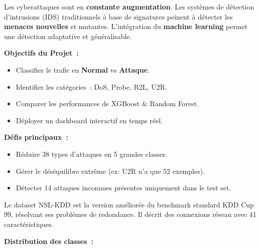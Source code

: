 \documentclass{article}
\newlength{\colW}  \setlength{\colW}{180mm}
\newcommand{\bodyfont}{\fontsize{16}{22}\selectfont}
\newcommand{\labelfont}{\fontsize{14}{18}\selectfont\bfseries}
\newcommand{\citem}[1]{\item[\textcolor{Secondary}{\faCaretRight}] #1}
\begin{document}
\noindent
\begin{minipage}[t]{\colW}

\begin{tcolorbox}[pc, title={\faShieldAlt\; Contexte \& Objectifs}]
\bodyfont\color{TextMain}
Les cyberattaques sont en \textbf{\color{Primary}constante augmentation}. Les syst\`emes de d\'etection d'intrusions (IDS) traditionnels \`a base de signatures peinent \`a d\'etecter les \textbf{\color{Secondary}menaces nouvelles} et mutantes. L'int\'egration du \textbf{machine learning} permet une d\'etection adaptative et g\'en\'eralisable.

\vspace{5mm}
{\labelfont\color{Primary}Objectifs du Projet~:}
\begin{itemize}[leftmargin=6mm, itemsep=2mm, topsep=2mm]
  \citem{Classifier le trafic en \textbf{Normal} vs \textbf{Attaque}.}
  \citem{Identifier les cat\'egories~: DoS, Probe, R2L, U2R.}
  \citem{Comparer les performances de XGBoost \& Random Forest.}
  \citem{D\'eployer un dashboard interactif en temps r\'eel.}
\end{itemize}

\vspace{5mm}
{\labelfont\color{Primary}D\'efis principaux~:}
\begin{itemize}[leftmargin=6mm, itemsep=2mm, topsep=2mm]
  \citem{R\'eduire 38 types d'attaques en 5 grandes classes.}
  \citem{G\'erer le d\'es\'equilibre extr\^eme (ex: U2R n'a que 52 exemples).}
  \citem{D\'etecter 14 attaques inconnues pr\'esentes uniquement dans le test set.}
\end{itemize}
\end{tcolorbox}

\vspace{8mm}

\begin{tcolorbox}[pc, title={\faDatabase\; Dataset NSL-KDD}]
\bodyfont\color{TextMain}
Le dataset NSL-KDD est la version am\'elior\'ee du benchmark standard KDD Cup 99, r\'esolvant ses probl\`emes de redondance. Il d\'ecrit des connexions r\'eseau avec 41 caract\'eristiques.

\vspace{6mm}
{\labelfont\color{Primary}Distribution des classes~:}
\vspace{2mm}


\end{tcolorbox}
\end{minipage}
\end{document}
